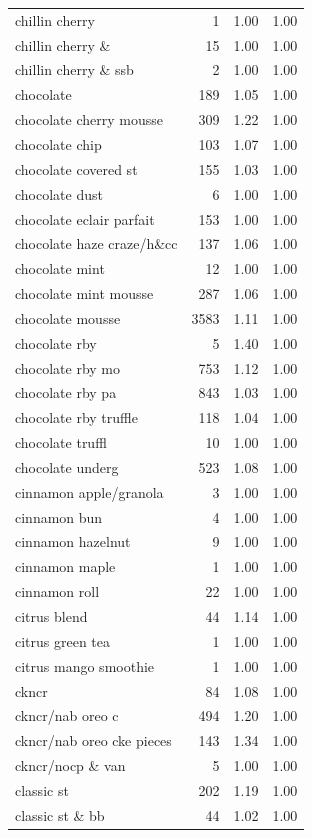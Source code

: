 \begin{table}
\begin{tabular}{lrrr}
chillin cherry & 1 & 1.00 & 1.00 \\
chillin cherry \& & 15 & 1.00 & 1.00 \\
chillin cherry \& ssb & 2 & 1.00 & 1.00 \\
chocolate & 189 & 1.05 & 1.00 \\
chocolate cherry mousse & 309 & 1.22 & 1.00 \\
chocolate chip & 103 & 1.07 & 1.00 \\
chocolate covered st & 155 & 1.03 & 1.00 \\
chocolate dust & 6 & 1.00 & 1.00 \\
chocolate eclair parfait & 153 & 1.00 & 1.00 \\
chocolate haze craze/h\&cc & 137 & 1.06 & 1.00 \\
chocolate mint & 12 & 1.00 & 1.00 \\
chocolate mint mousse & 287 & 1.06 & 1.00 \\
chocolate mousse & 3583 & 1.11 & 1.00 \\
chocolate rby & 5 & 1.40 & 1.00 \\
chocolate rby mo & 753 & 1.12 & 1.00 \\
chocolate rby pa & 843 & 1.03 & 1.00 \\
chocolate rby truffle & 118 & 1.04 & 1.00 \\
chocolate truffl & 10 & 1.00 & 1.00 \\
chocolate underg & 523 & 1.08 & 1.00 \\
cinnamon apple/granola & 3 & 1.00 & 1.00 \\
cinnamon bun & 4 & 1.00 & 1.00 \\
cinnamon hazelnut & 9 & 1.00 & 1.00 \\
cinnamon maple & 1 & 1.00 & 1.00 \\
cinnamon roll & 22 & 1.00 & 1.00 \\
citrus blend & 44 & 1.14 & 1.00 \\
citrus green tea & 1 & 1.00 & 1.00 \\
citrus mango smoothie & 1 & 1.00 & 1.00 \\
ckncr & 84 & 1.08 & 1.00 \\
ckncr/nab oreo c & 494 & 1.20 & 1.00 \\
ckncr/nab oreo cke pieces & 143 & 1.34 & 1.00 \\
ckncr/nocp \& van & 5 & 1.00 & 1.00 \\
classic st & 202 & 1.19 & 1.00 \\
classic st \& bb & 44 & 1.02 & 1.00 \\

\end{tabular}
\end{table}
